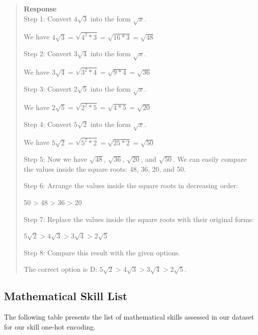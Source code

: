 \documentclass[11pt]{article}
\begin{document}
\begin{quote} %
    \textbf{Response} \\
    Step 1: Convert $4\sqrt3$ into the form $\sqrt{x}$.

    We have $4\sqrt3 = \sqrt{4^2 * 3} = \sqrt{16 * 3} = \sqrt{48}$

    \vspace{1em}

    Step 2: Convert $3\sqrt4$ into the form $\sqrt{x}$.

    We have $3\sqrt4 = \sqrt{3^2 * 4} = \sqrt{9 * 4} = \sqrt{36}$

    \vspace{1em}

    Step 3: Convert $2\sqrt5$ into the form $\sqrt{x}$.

    We have $2\sqrt5 = \sqrt{2^2 * 5} = \sqrt{4 * 5} = \sqrt{20}$

    \vspace{1em}

    Step 4: Convert $5\sqrt2$ into the form $\sqrt{x}$.

    We have $5\sqrt2 = \sqrt{5^2 * 2} = \sqrt{25 * 2} = \sqrt{50}$

    \vspace{1em}

    Step 5: Now we have $\sqrt{48}$, $\sqrt{36}$, $\sqrt{20}$, and $\sqrt{50}$. We can easily compare the values inside the square roots: 48, 36, 20, and 50.

    \vspace{1em}

    Step 6: Arrange the values inside the square roots in decreasing order:

    50 > 48 > 36 > 20

    \vspace{1em}

    Step 7: Replace the values inside the square roots with their original forms:

    $5\sqrt2 > 4\sqrt3 > 3\sqrt4 > 2\sqrt5$

    \vspace{1em}

    Step 8: Compare this result with the given options.

    The correct option is D: $5\sqrt2 > 4\sqrt3 > 3\sqrt4 > 2\sqrt5$.
\end{quote}

\subsection{Mathematical Skill List}
\label{tab:math-skills} %
The following table presents the list of mathematical skills assessed in our dataset for our skill one-hot encoding.
\end{document}
